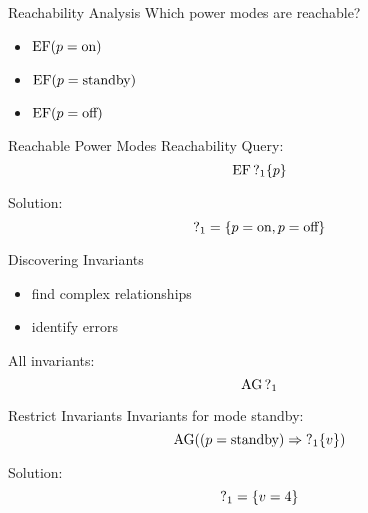 \begin{frame}{Reachability Analysis}
  Which power modes are reachable?
  \begin{itemize}
    \item $\operatorname{EF} (p = \text{on})$
    \item $\operatorname{EF} (p = \text{standby})$
    \item $\operatorname{EF} (p = \text{off})$
  \end{itemize}
\end{frame}

\begin{frame}{Reachable Power Modes}
  Reachability Query:
  \[\operatorname{EF} \operatorname{?}_1\{p\}\]

  Solution:
  \[ \operatorname{?}_1 = \{p = \text{on}, p = \text{off}\} \]
\end{frame}



\begin{frame}{Discovering Invariants}
  \begin{itemize}
    \item find complex relationships
    \item identify errors
  \end{itemize}

  All invariants:
  \[ \operatorname{AG} \operatorname{?}_1 \]
\end{frame}

\begin{frame}{Restrict Invariants}
  Invariants for mode standby:
  \[ \operatorname{AG} ((p = \text{standby}) \Rightarrow \operatorname{?}_1\{v\}) \]

  Solution:
  \[ \operatorname{?}_1 = \{v = 4\} \]
\end{frame}

%  



